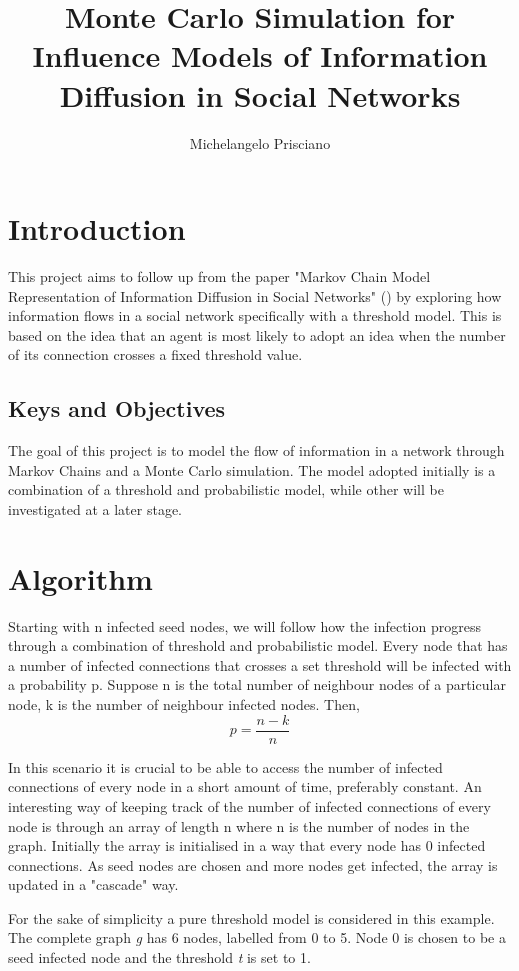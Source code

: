 \documentclass{article}
\title{Monte Carlo Simulation for Influence Models of Information Diffusion in Social Networks}
\author{Michelangelo Prisciano}
\begin{document}
\maketitle

\section{Introduction}

This project aims to follow up from the paper "Markov Chain Model Representation of Information Diffusion in Social Networks"
(\cite{monte_carlo_sim}) by exploring how information flows in a social network specifically with a threshold model.
This is based on the idea that an agent is most likely to adopt an idea when the number of its connection crosses a fixed threshold value.

\subsection{Keys and Objectives}
The goal of this project is to model the flow of information in a network through Markov Chains and a Monte Carlo simulation. The model adopted
initially is a combination of a threshold and probabilistic model, while other will be investigated at a later stage.

\section{Algorithm}
Starting with n infected seed nodes, we will follow how the infection progress through a combination of threshold and probabilistic
model. Every node that has a number of infected connections that crosses a set threshold will be infected with a probability p.
Suppose n is the total number of neighbour nodes of a particular node, k is the number of neighbour infected nodes. Then,
\[
    p = \frac{n-k}{n}
\]

In this scenario it is crucial to be able to access the number of infected connections of every node in a short amount of time,
preferably constant. An interesting way of keeping track of the number of infected connections of every node is through an array
of length n where n is the number of nodes in the graph. Initially the array is initialised in a way that every node has 0 infected
connections. As seed nodes are chosen and more nodes get infected, the array is updated in a "cascade" way. \newpage

For the sake of simplicity a pure threshold model is considered in this example. The complete graph \emph{g} has 6 nodes,
labelled from 0 to 5. Node 0 is chosen to be a seed infected node and the threshold \emph{t} is set to 1. \\ \\
\end{document}
